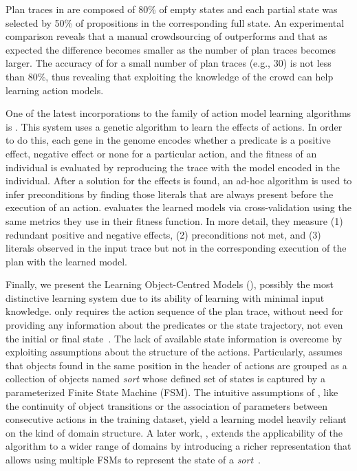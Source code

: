 Plan traces in \CAMA are composed of 80\% of empty states and each partial state was selected by 50\% of propositions in the corresponding full state. An experimental comparison reveals that a manual crowdsourcing of \CAMA outperforms \ARMS and that as expected the difference becomes smaller as the number of plan traces becomes larger. The accuracy of \CAMA for a small number of plan traces (e.g., 30) is not less than 80\%, thus revealing that exploiting the knowledge of the crowd can help learning action models.


One of the latest incorporations to the family of action model learning algorithms is \LOUGA. This system uses a genetic algorithm to learn the effects of actions. In order to do this, each gene in the genome encodes whether a predicate is a positive effect, negative effect or none for a particular action, and the fitness of an individual is evaluated by reproducing the trace with the model encoded in the individual. After a solution for the effects is found, an ad-hoc algorithm is used to infer preconditions by finding those literals that are always present before the execution of an action. \LOUGA evaluates the learned models via cross-validation using the same metrics they use in their fitness function. In more detail, they measure (1) redundant positive and negative effects, (2) preconditions not met, and (3) literals observed in the input trace but not in the corresponding execution of the plan with the learned model.

\vspace{0.15cm}


Finally, we present the Learning Object-Centred Models (\textbf{\LOCM}), possibly the most distinctive learning system due to its ability of learning with minimal input knowledge. \textbf{\LOCM} only requires the \FO action sequence of the plan trace, without need for providing any information about the predicates or the state trajectory, not even the initial or final state~\cite{CresswellMW09,cresswell2013acquiring}. The lack of available state information is overcome by exploiting assumptions about the structure of the actions. Particularly, \LOCM assumes that objects found in the same position in the header of actions are grouped as a collection of objects named \emph{sort} whose defined set of states is captured by a parameterized Finite State Machine (FSM). The intuitive assumptions of \LOCM, like the continuity of object transitions or the association of parameters between consecutive actions in the training dataset, yield a learning model heavily reliant on the kind of domain structure. A later work, \textbf{\LOCMtwo}, extends the applicability of the \LOCM algorithm to a wider range of domains by introducing a richer representation that allows using multiple FSMs to represent the state of a \emph{sort}~\cite{cresswell2011generalised}.

